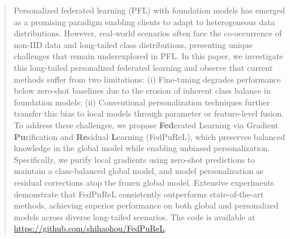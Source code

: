 \documentclass[10pt,twocolumn,letterpaper]{article}
\begin{document}
\begin{abstract}


\vspace{-0.5em}
Personalized federated learning (PFL) with foundation models has emerged as a promising paradigm enabling clients to adapt to heterogeneous data distributions. However, real-world scenarios often face the co-occurrence of non-IID data and long-tailed class distributions, presenting unique challenges that remain underexplored in PFL. In this paper, we investigate this long-tailed personalized federated learning and observe that current methods suffer from two limitations: (i) Fine-tuning degrades performance below zero-shot baselines due to the erosion of inherent class balance in foundation models; (ii) Conventional personalization techniques further transfer this bias to local models through parameter or feature-level fusion. To address these challenges, we propose \textbf{Fed}erated Learning via Gradient \textbf{Pu}rification and \textbf{Re}sidual \textbf{L}earning (FedPuReL), which preserves balanced knowledge in the global model while enabling unbiased personalization. Specifically, we purify local gradients using zero-shot predictions to maintain a class-balanced global model, and model personalization as residual corrections atop the frozen global model. Extensive experiments demonstrate that FedPuReL consistently outperforms state-of-the-art methods, achieving superior performance on both global and personalized models across diverse long-tailed scenarios. The code is available at \url{https://github.com/shihaohou/FedPuReL}.
\vspace{-1em}

\end{abstract}
\end{document}
